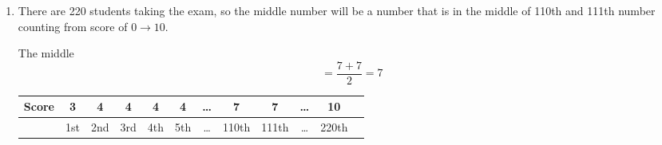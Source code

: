 \documentclass[12pt]{article}
\begin{document}
\begin{enumerate}
        \item There are 220 students taking the exam, so the middle number will be a number that is in the middle of 110th and 111th number counting from score of $0 \to 10$. \par
        The middle $$=\frac{7+7}{2}= 7 $$
        
        \begin{center}
            \begin{tabular}{l | c|c|c|c|c|c|c|c|c|c |r}
                Score & 3 & 4 & 4 & 4 & 4 & \dots & 7 & 7 & \dots & 10 \\
                \hline
                &1st &2nd &3rd &4th &5th &\dots &110th &111th &\dots & 220th \\
            \end{tabular}
        \end{center}
        
    \end{enumerate}
\end{document}
